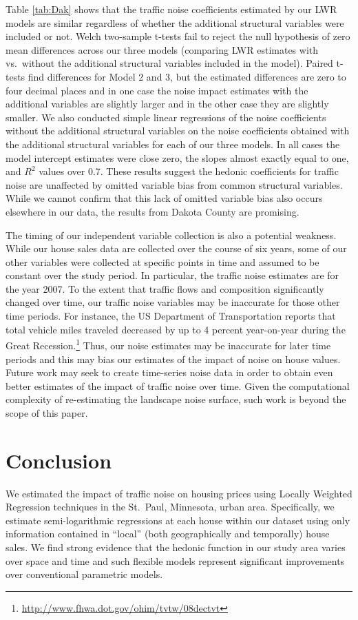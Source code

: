 \documentclass{article}\usepackage{graphicx, color}
\begin{document}
Table \ref{tab:Dak} shows that the traffic noise coefficients estimated by our LWR models are similar regardless of whether the additional structural variables were included or not. Welch two-sample t-tests fail to reject the null hypothesis of zero mean differences across our three models (comparing LWR estimates with vs.\ without the additional structural variables included in the model). Paired t-tests find differences for Model 2 and 3, but the estimated differences are zero to four decimal places and in one case the noise impact estimates with the additional variables are slightly larger and in the other case they are slightly smaller. We also conducted simple linear regressions of the noise coefficients without the additional structural variables on the noise coefficients obtained with the additional structural variables for each of our three models. In all cases the model intercept estimates were close zero, the slopes almost exactly equal to one, and $R^2$ values over 0.7. These results suggest the hedonic coefficients for traffic noise are unaffected by omitted variable bias from common structural variables. While we cannot confirm that this lack of omitted variable bias also occurs elsewhere in our data, the results from Dakota County are promising. 

The timing of our independent variable collection is also a potential weakness. While our house sales data are collected over the course of six years, some of our other variables were collected at specific points in time and assumed to be constant over the study period. In particular, the traffic noise estimates are for the year 2007. To the extent that traffic flows and composition significantly changed over time, our traffic noise variables may be inaccurate for those other time periods. For instance, the US Department of Transportation reports that total vehicle miles traveled decreased by up to 4 percent year-on-year during the Great Recession.\footnote{\url{http://www.fhwa.dot.gov/ohim/tvtw/08dectvt}} Thus, our noise estimates may be inaccurate for later time periods and this may bias our estimates of the impact of noise on house values. Future work may seek to create time-series noise data in order to obtain even better estimates of the impact of traffic noise over time. Given the computational complexity of re-estimating the landscape noise surface, such work is beyond the scope of this paper.

\section{Conclusion}
We estimated the impact of traffic noise on housing prices using Locally Weighted Regression techniques in the St.\ Paul, Minnesota, urban area. Specifically, we estimate semi-logarithmic regressions at each house within our dataset using only information contained in ``local'' (both geographically and temporally) house sales. We find strong evidence that the hedonic function in our study area varies over space and time and such flexible models represent significant improvements over conventional parametric models. 
\end{document}
